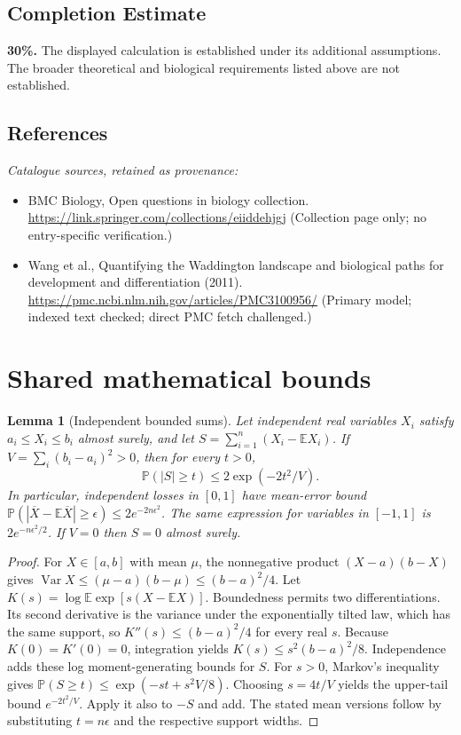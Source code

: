 \documentclass[11pt]{article}
\newcommand{\E}{\mathbb E}
\newcommand{\Prob}{\mathbb P}
\DeclareMathOperator{\Var}{Var}
\providecommand{\E}{\mathbb E}
\providecommand{\Prob}{\mathbb P}
\providecommand{\Var}{\operatorname{Var}}
\newtheorem{sharedlemma}{Lemma}[section]
\begin{document}
\subsection{Completion Estimate}
\textbf{30\%.} The displayed calculation is established under its additional assumptions. The broader theoretical and biological requirements listed above are not established.
\subsection{References}
\noindent\emph{Catalogue sources, retained as provenance:}
\begin{itemize}
\item BMC Biology, Open questions in biology collection. \url{https://link.springer.com/collections/eiiddehjgj} (Collection page only; no entry-specific verification.)
\item Wang et al., Quantifying the Waddington landscape and biological paths for development and differentiation (2011). \url{https://pmc.ncbi.nlm.nih.gov/articles/PMC3100956/} (Primary model; indexed text checked; direct PMC fetch challenged.)
\end{itemize}
\clearpage


\appendix
\section{Shared mathematical bounds}\label{app:bounds}
\begin{sharedlemma}[Independent bounded sums]\label{lem:bounded}
Let independent real variables $X_i$ satisfy $a_i\leq X_i\leq b_i$ almost surely,
and let $S=\sum_{i=1}^n(X_i-\E X_i)$. If
$V=\sum_i(b_i-a_i)^2>0$, then for every $t>0$,
\[
 \Prob(|S|\geq t)\leq 2\exp(-2t^2/V).
\]
In particular, independent losses in $[0,1]$ have mean-error bound
$\Prob(|\overline X-\E\overline X|\geq\epsilon)
\leq2e^{-2n\epsilon^2}$. The same expression for variables in $[-1,1]$
is $2e^{-n\epsilon^2/2}$. If $V=0$ then $S=0$ almost surely.
\end{sharedlemma}
\begin{proof}
For $X\in[a,b]$ with mean $\mu$, the nonnegative product
$(X-a)(b-X)$ gives
$\Var X\leq(\mu-a)(b-\mu)\leq(b-a)^2/4$.
Let $K(s)=\log\E\exp[s(X-\E X)]$.
Boundedness permits two differentiations. Its second derivative is the variance
under the exponentially tilted law, which has the same support, so
$K''(s)\leq(b-a)^2/4$ for every real $s$.
Because $K(0)=K'(0)=0$, integration yields
$K(s)\leq s^2(b-a)^2/8$.
Independence adds these log moment-generating bounds for $S$.
For $s>0$, Markov's inequality gives
$\Prob(S\geq t)\leq\exp(-st+s^2V/8)$.
Choosing $s=4t/V$ yields the upper-tail bound $e^{-2t^2/V}$.
Apply it also to $-S$ and add. The stated mean versions follow by substituting
$t=n\epsilon$ and the respective support widths.
\end{proof}
\end{document}
